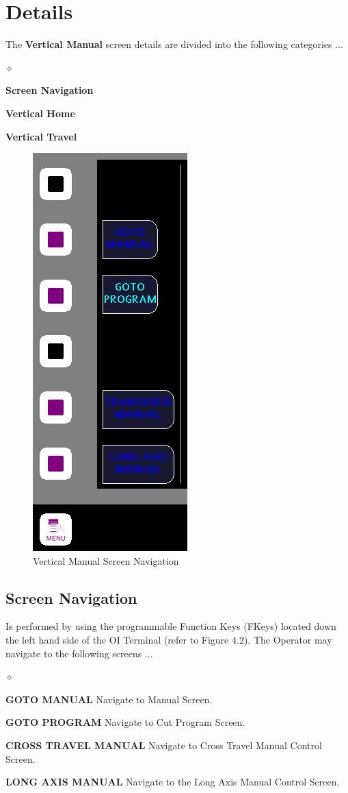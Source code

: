 \section{Details}The \textbf{Vertical Manual} screen details are divided into the following categories ...
\begin{list}{$\diamond$}{}
	\item \textbf{Screen Navigation}
	\item \textbf{Vertical Home}
	\item \textbf{Vertical Travel}
\end{list}
\begin{figure}
	\centering
	\includegraphics[width=0.2\linewidth]{screen-captures/vert-manual-nav}
	\caption{Vertical Manual Screen Navigation}
	\label{fig:manual-vertical-screen-nav}
\end{figure}
\subsection{Screen Navigation}Is performed by using the programmable Function Keys (FKeys) located down the left hand side of the OI Terminal (refer to Figure 4.2). The Operator may navigate to the following screens ...
\begin{list}{$\diamond$}{}
	\item \textbf{GOTO MANUAL} Navigate to Manual Screen.
	\item \textbf{GOTO PROGRAM} Navigate to Cut Program Screen.
	\item \textbf{CROSS TRAVEL MANUAL} Navigate to Cross Travel Manual Control Screen.
	\item \textbf{LONG AXIS MANUAL} Navigate to the Long Axis Manual Control Screen.
\end{list}
